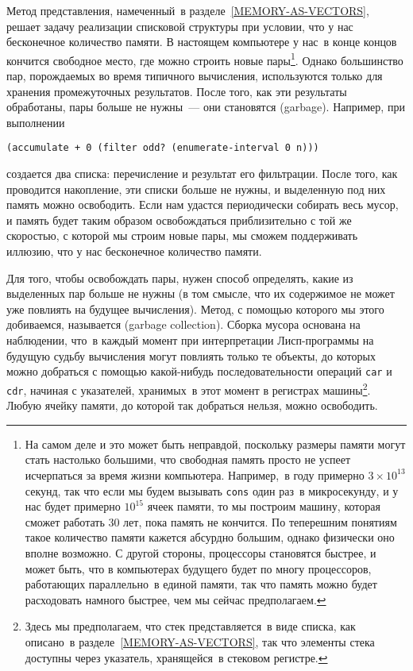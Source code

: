 Метод представления, намеченный~в 
разделе~\ref{MEMORY-AS-VECTORS}, решает задачу реализации
списковой структуры при условии, что у нас бесконечное количество
памяти.  В настоящем компьютере у нас~в конце концов кончится
свободное место, где можно строить новые пары\footnote{На самом деле и это может быть неправдой,
поскольку размеры памяти могут стать настолько большими, что свободная
память просто не успеет исчерпаться за время жизни компьютера.
Например,~в году примерно $3 \times 10^{13}$ секунд, так
что если мы будем вызывать {\tt cons} один раз~в микросекунду,
и у нас будет примерно $10^{15}$ ячеек памяти, то мы
построим машину, которая сможет работать 30 лет, пока память не
кончится.  По теперешним понятиям такое количество памяти кажется
абсурдно большим, однако физически оно вполне возможно.  С другой
стороны, процессоры становятся быстрее, и может быть, что в
компьютерах будущего будет по многу процессоров, работающих
параллельно~в единой памяти, так что память можно будет расходовать
намного быстрее, чем мы сейчас предполагаем.
}.
Однако большинство пар, порождаемых во время типичного вычисления,
используются только для хранения промежуточных результатов. После
того, как эти результаты обработаны, пары больше не нужны~--- они
становятся  (garbage).  Например, при
выполнении

\begin{Verbatim}[fontsize=\small]
(accumulate + 0 (filter odd? (enumerate-interval 0 n)))
\end{Verbatim}
создается два списка: перечисление и результат его фильтрации.  После
того, как проводится накопление, эти списки больше не нужны, и
выделенную под них память можно освободить.  Если нам удастся
периодически собирать весь мусор, и память будет таким образом
освобождаться приблизительно с той же скоростью, с которой мы строим
новые пары, мы сможем поддерживать иллюзию, что у нас бесконечное
количество памяти.

Для того, чтобы освобождать пары, нужен способ
определять, какие из выделенных пар больше не нужны (в том смысле, что
их содержимое не может уже повлиять на будущее вычисления).  Метод, с
помощью которого мы этого добиваемся, называется  (garbage collection).  Сборка мусора основана на наблюдении, что~в каждый
момент при интерпретации Лисп-программы на будущую судьбу вычисления могут
повлиять только те объекты, до которых можно добраться с помощью
какой-нибудь последовательности операций {\tt car} и
{\tt cdr}, начиная с указателей, хранимых~в этот момент в
регистрах машины\footnote{Здесь мы предполагаем, что стек представляется~в виде
списка, как описано~в разделе~\ref{MEMORY-AS-VECTORS}, так
что элементы стека доступны через указатель, хранящейся~в стековом
регистре.}.
Любую ячейку памяти, до которой так добраться нельзя, можно освободить.

